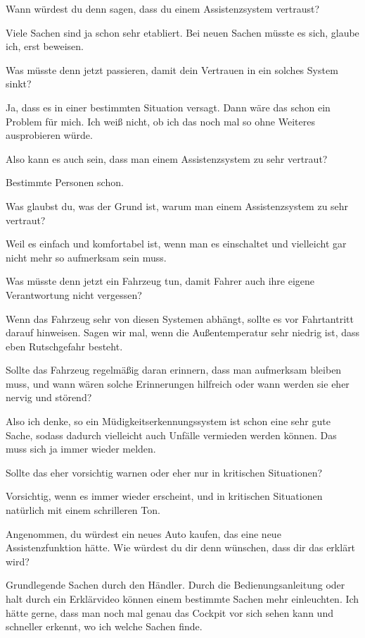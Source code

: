 \interviewerin
Wann würdest du denn sagen, dass du einem Assistenzsystem vertraust?

Viele Sachen sind ja schon sehr etabliert. Bei neuen Sachen müsste es
sich, glaube ich, erst beweisen.

\interviewerin
Was müsste denn jetzt passieren, damit dein Vertrauen in ein solches
System sinkt?

Ja, dass es in einer bestimmten Situation versagt. Dann wäre das schon
ein Problem für mich. Ich weiß nicht, ob ich das noch mal so ohne
Weiteres ausprobieren würde.

\interviewerin
Also kann es auch sein, dass man einem Assistenzsystem zu sehr vertraut?

Bestimmte Personen schon.

\interviewerin
Was glaubst du, was der Grund ist, warum man einem Assistenzsystem zu
sehr vertraut?

Weil es einfach und komfortabel ist, wenn man es einschaltet und
vielleicht gar nicht mehr so aufmerksam sein muss.

\interviewerin
Was müsste denn jetzt ein Fahrzeug tun, damit Fahrer auch ihre eigene
Verantwortung nicht vergessen?

Wenn das Fahrzeug sehr von diesen Systemen abhängt, sollte es vor
Fahrtantritt darauf hinweisen. Sagen wir mal, wenn die Außentemperatur
sehr niedrig ist, dass eben Rutschgefahr besteht.

\interviewerin
Sollte das Fahrzeug regelmäßig daran erinnern, dass man aufmerksam
bleiben muss, und wann wären solche Erinnerungen hilfreich oder wann
werden sie eher nervig und störend?

Also ich denke, so ein Müdigkeitserkennungssystem ist schon eine sehr
gute Sache, sodass dadurch vielleicht auch Unfälle vermieden werden
können. Das muss sich ja immer wieder melden.

\interviewerin
Sollte das eher vorsichtig warnen oder eher nur in kritischen
Situationen?

Vorsichtig, wenn es immer wieder erscheint, und in kritischen
Situationen natürlich mit einem schrilleren Ton.

\interviewerin
Angenommen, du würdest ein neues Auto kaufen, das eine neue
Assistenzfunktion hätte. Wie würdest du dir denn wünschen, dass dir das
erklärt wird?

Grundlegende Sachen durch den Händler. Durch die Bedienungsanleitung
oder halt durch ein Erklärvideo können einem bestimmte Sachen mehr
einleuchten. Ich hätte gerne, dass man noch mal genau das Cockpit vor
sich sehen kann und schneller erkennt, wo ich welche Sachen finde.

